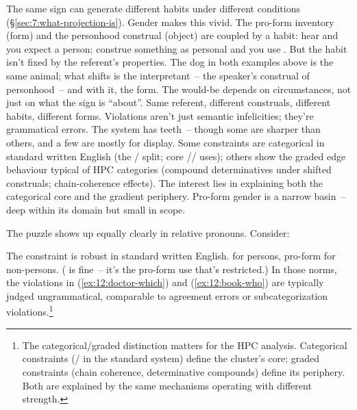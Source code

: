 The same sign can generate different habits under different conditions (§\ref{sec:7:what-projection-is}). Gender makes this vivid. The pro-form inventory (form) and the personhood construal (object) are coupled by a habit: hear  and you expect a person; construe something as personal and you use . But the habit isn't fixed by the referent's properties. The dog in both examples above is the same animal; what shifts is the interpretant~-- the speaker's construal of personhood~-- and with it, the form. The would-be depends on circumstances, not just on what the sign is \enquote{about}. Same referent, different construals, different habits, different forms. Violations aren't just semantic infelicities; they're grammatical errors. The system has teeth~-- though some are sharper than others, and a few are mostly for display. Some constraints are categorical in standard written English (the / split; core // uses); others show the graded edge behaviour typical of HPC categories (compound determinatives under shifted construals; chain-coherence effects). The interest lies in explaining both the categorical core and the gradient periphery. Pro-form gender is a narrow basin~-- deep within its domain but small in scope.

The puzzle shows up equally clearly in relative pronouns. Consider:


\z
{}
\z
{}
\z
{}
\z

The constraint is robust in standard written English.  for persons, pro-form  for non-persons. ( is fine~-- it's the pro-form use that's restricted.) In those norms, the violations in (\ref{ex:12:doctor-which}) and (\ref{ex:12:book-who}) are typically judged ungrammatical, comparable to agreement errors or subcategorization violations.\footnote{The categorical/graded distinction matters for the HPC analysis. Categorical constraints (/ in the standard system) define the cluster's core; graded constraints (chain coherence, determinative compounds) define its periphery. Both are explained by the same mechanisms operating with different strength.}

